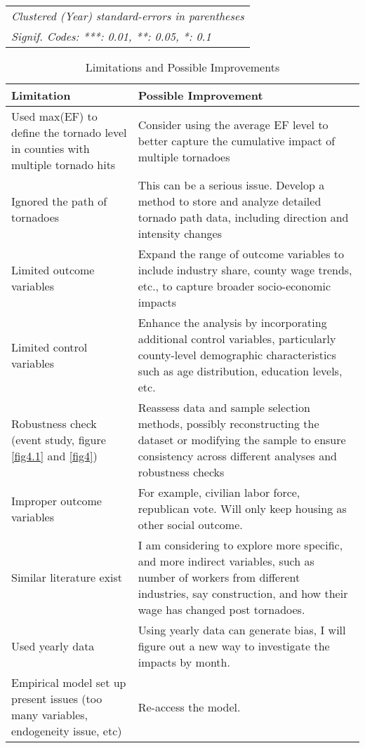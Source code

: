 \documentclass[letterpaper]{article}
\begin{document}
\begin{table}[H]
{\begin{tabular}{lccccccccc}
   \midrule \midrule
   \multicolumn{10}{l}{\emph{Clustered (Year) standard-errors in parentheses}}\\
   \multicolumn{10}{l}{\emph{Signif. Codes: ***: 0.01, **: 0.05, *: 0.1}}\\
\end{tabular}}
\end{table}

\begin{table}[H]
    \centering
    \caption{Limitations and Possible Improvements}
    \label{issue}
    \begin{tabular}{|p{7cm}|p{7cm}|}
        \hline
        \textbf{Limitation} & \textbf{Possible Improvement} \\
        \hline
        Used max(EF) to define the tornado level in counties with multiple tornado hits & Consider using the average EF level to better capture the cumulative impact of multiple tornadoes \\
        \hline
        Ignored the path of tornadoes & This can be a serious issue. Develop a method to store and analyze detailed tornado path data, including direction and intensity changes \\
        \hline
        Limited outcome variables & Expand the range of outcome variables to include industry share, county wage trends, etc., to capture broader socio-economic impacts \\
        \hline
        Limited control variables & Enhance the analysis by incorporating additional control variables, particularly county-level demographic characteristics such as age distribution, education levels, etc. \\
        \hline
        Robustness check (event study, figure \ref{fig4.1} and \ref{fig4}) & Reassess data and sample selection methods, possibly reconstructing the dataset or modifying the sample to ensure consistency across different analyses and robustness checks \\
        \hline
        Improper outcome variables & For example, civilian labor force, republican vote. Will only keep housing as other social outcome. \\
        \hline
        Similar literature exist & I am considering to explore more specific, and more indirect variables, such as number of workers from different industries, say construction, and how their wage has changed post tornadoes. \\
        \hline
        Used yearly data & Using yearly data can generate bias, I will figure out a new way to investigate the impacts by month. \\
        \hline
        Empirical model set up present issues (too many variables, endogeneity issue, etc) & Re-access the model. \\
        \hline
    \end{tabular}
\end{table}
\end{document}
